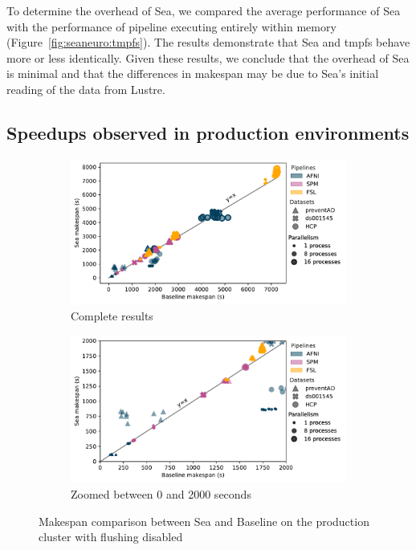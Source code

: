 To determine the overhead of Sea, we compared the average performance of Sea with
the performance of pipeline executing entirely within memory
(Figure~\ref{fig:seaneuro:tmpfs}). The results demonstrate that Sea and tmpfs
behave more or less identically. Given these results, we conclude that the
overhead of Sea is minimal and that the differences in makespan may be
due to Sea's initial reading of the data from Lustre.


\subsection{Speedups observed in production environments}

\begin{figure}

\begin{subfigure}{\textwidth}
    \centering
    \captionsetup{width=.85\linewidth}
    \includegraphics[width=\columnwidth]{figures/sea-neuro/beluga_withoutflush_nozoom.pdf}%
    \caption{Complete results}\label{fig:seaneuro:belugafull}
\end{subfigure}
\begin{subfigure}{\textwidth}
    \centering
    \captionsetup{width=.85\linewidth}
    \includegraphics[width=\linewidth]{figures/sea-neuro/beluga_withoutflush_zoom.pdf}
    \caption{Zoomed between 0 and 2000 seconds}\label{fig:seaneuro:belugazoom}
\end{subfigure}
\caption{Makespan comparison between Sea and Baseline on the production cluster with flushing disabled}
\label{fig:seaneuro:beluga-noflush}
\end{figure}

